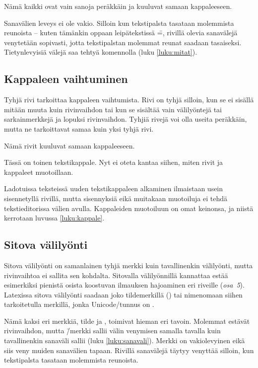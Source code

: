 \begin{tulossis}
  Nämä kaikki ovat vain sanoja peräkkäin ja kuuluvat samaan
  kappaleeseen.
\end{tulossis}

Sanavälien leveys ei ole vakio. Silloin kun tekstipalsta tasataan
molemmista reunoista -- kuten tämänkin oppaan leipätekstissä \==,
rivillä olevia sanavälejä venytetään sopivasti, jotta tekstipalstan
molemmat reunat saadaan tasaiseksi. Tietynlevyisiä välejä saa tehtyä
komennolla  (luku \ref{luku:mitat}).

\subsection{Kappaleen vaihtuminen}

Tyhjä rivi tarkoittaa kappaleen vaihtumista. Rivi on tyhjä silloin, kun
se ei sisällä mitään muuta kuin rivinvaihdon tai kun se sisältää vain
välilyöntejä tai sarkainmerkkejä ja lopuksi rivinvaihdon. Tyhjiä rivejä
voi olla useita peräkkäin, mutta ne tarkoittavat samaa kuin yksi tyhjä
rivi.

\begin{koodilohkosis}
  Nämä rivit kuuluvat
  samaan kappaleeseen.

  Tässä on toinen tekstikappale.
  Nyt ei oteta kantaa siihen, miten
  rivit ja kappaleet muotoillaan.
\end{koodilohkosis}

Ladotuissa teksteissä uuden tekstikappaleen alkaminen ilmaistaan usein
sisennetyllä rivillä, mutta sisennyksiä eikä muitakaan muotoiluja ei
tehdä tekstieditorissa välien avulla. Kappaleiden muotoiluun on omat
keinonsa, ja niistä kerrotaan luvussa \ref{luku:kappale}.

\subsection{Sitova välilyönti}

Sitova välilyönti on samanlainen tyhjä merkki kuin tavallinenkin
välilyönti, mutta rivinvaihtoa ei sallita sen kohdalta. Sitovalla
välilyönnillä kannattaa estää esimerkiksi pienistä osista koostuvan
ilmauksen hajoaminen eri riveille (\emph{osa~5}). Latexissa sitova
välilyönti saadaan joko tildemerkillä (\koodi{\textasciitilde}) tai
nimenomaan siihen tarkoitetulla merkillä, jonka Unicode\-/tunnus on
.

Nämä kaksi eri merkkiä, tilde ja , toimivat hieman eri
tavoin. Molemmat estävät rivinvaihdon, mutta
\koodi{\textasciitilde}\=/merkki sallii välin venymisen samalla tavalla
kuin tavallinenkin sanaväli sallii (luku \ref{luku:sanavali}). Merkki
 on vakiolevyinen eikä siis veny muiden sanavälien
tapaan. Rivillä sanavälejä täytyy venyttää silloin, kun tekstipalsta
tasataan molemmista reunoista.

